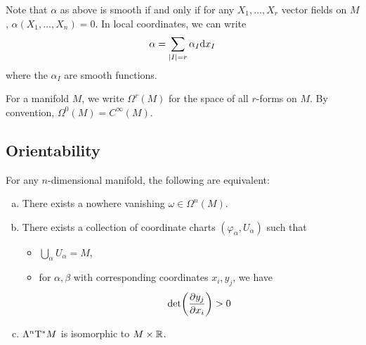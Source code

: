 \documentclass{article}
\begin{document}
Note that \(\alpha\) as above is smooth if and only if for any \(X_1, \dots, X_r\) vector fields on \(M\), \(\alpha(X_1, \dots, X_n) = 0\). In local coordinates, we can write
\[\alpha = \sum_{\abs{I} = r}\alpha_I \dd x_I\]
where the \(\alpha_I\) are smooth functions.

\begin{definition}
     For a manifold \(M\), we write \(\Omega^r(M)\) for the space of all \(r\)-forms on \(M\). By convention, \(\Omega^0(M) = C^\infty(M)\).
\end{definition}

\subsection{Orientability}

\begin{theorem}
    For any \(n\)-dimensional manifold, the following are equivalent:
    \begin{enumerate}[(a)]
        \item There exists a nowhere vanishing \(\omega \in \Omega^n(M)\).
        \item There exists a collection of coordinate charts \((\varphi_\alpha, U_\alpha)\) such that
        \begin{itemize}
            \item \(\bigcup_\alpha U_\alpha = M\),
            \item for \(\alpha, \beta\) with corresponding coordinates \(x_i, y_j\), we have
            \[\det(\pdv{y_j}{x_i}) > 0\]
        \end{itemize}
        \item \(\Lambda^n \mathrm{T}^* M\) is isomorphic to \(M \times \mathbb{R}\).
    \end{enumerate}
\end{theorem}
\end{document}
